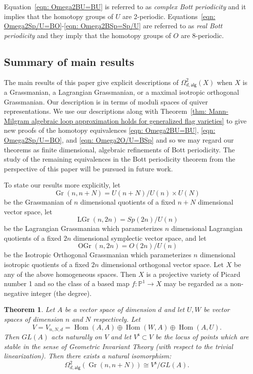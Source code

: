 \documentclass{amsart}
\newtheorem{theorem}{Theorem}[section]
\theoremstyle{definition}
\newcommand{\PP}{\mathbb{P}}
\newcommand{\Hom}{\operatorname{Hom}}
\newcommand{\alg}{\mathsf{alg}}
\newcommand{\stable}{\mathsf{s}}
\newcommand{\Gr}{\operatorname{Gr}}
\newcommand{\LGr}{\operatorname{LGr}}
\newcommand{\OGr}{\operatorname{OGr}}
\newcommand{\LoopTwo}{\Omega^{2}_{d,\alg}}
\begin{document}
Equation~\eqref{eqn: Omega2BU=BU} is referred to as \emph{complex Bott
periodicity} and it implies that the homotopy groups of $U$ are
2-periodic. Equations~\eqref{eqn: Omega2Sp/U=BO}-\eqref{eqn: Omega2BSp=Sp/U} 
are referred to as \emph{real Bott periodicity} and they imply that
the homotopy groups of $O$ are 8-periodic.

\subsection{Summary of main results}

The main results of this paper give explicit descriptions of $\LoopTwo
(X)$ when $X$ is a Grassmanian, a Lagrangian Grassmanian, or a maximal
isotropic orthogonal Grassmanian. Our description is in terms of
moduli spaces of quiver representations. We use our descriptions along
with Theorem~\ref{thm: Mann-Milgram algebraic loop approximation
holds for generalized flag varieties} to give new proofs of the
homotopy equivalences \eqref{eqn: Omega2BU=BU}, \eqref{eqn:
Omega2Sp/U=BO}, and \eqref{eqn: Omega2O/U=BSp} and so we may regard
our theorems as finite dimensional, algebraic refinements of Bott
periodicity. The study of the remaining equivalences in the Bott
periodicity theorem from the perspective of this paper will be pursued
in future work.

To state our results more explicitly, let 
\[
\Gr(n,n+N) = U(n+N)/U(n)\times U(N)
\]
be the Grassmanian of $n$ dimensional quotients of a fixed $n+N$
dimensional vector space,  let
\[
\LGr (n,2n)= Sp(2n) /U(n)
\]
be the Lagrangian Grassmanian
which parameterizes $n$ dimensional Lagrangian quotients of a fixed
$2n$ dimensional symplectic vector space, and let
\[
\OGr (n,2n) = O(2n)/U(n)
\]
be the Isotropic Orthogonal Grassmanian which parameterizes $n$
dimensional isotropic quotients of a fixed $2n$ dimensional orthogonal
vector space. Let $X$ be any of the above homogeneous spaces. Then $X$
is a projective variety of Picard number 1 and so the class of a based
map $f:\PP^{1}\to X$ may be regarded as a non-negative integer (the
degree).



\begin{theorem}\label{thm: quiver description of Loop2alg(Gr(n,n+N))}
Let $A$ be a vector space of dimension $d$ and let $U,W$ be vector
spaces of dimension $n$ and $N$ respectively. Let
\[
V=V_{n,N,d} =\Hom (A,A)\oplus \Hom (W,A)\oplus \Hom (A,U).
\]
Then $GL(A)$ acts naturally on $V$ and let $V^{\stable}\subset V$ be
the locus of points which are stable in the sense of Geometric
Invariant Theory (with respect to the trivial linearization). Then
there exists a natural isomorphism:
\[
\LoopTwo (\Gr (n,n+N))\cong V^{\stable}/GL(A).
\]
\end{theorem}
\end{document}
